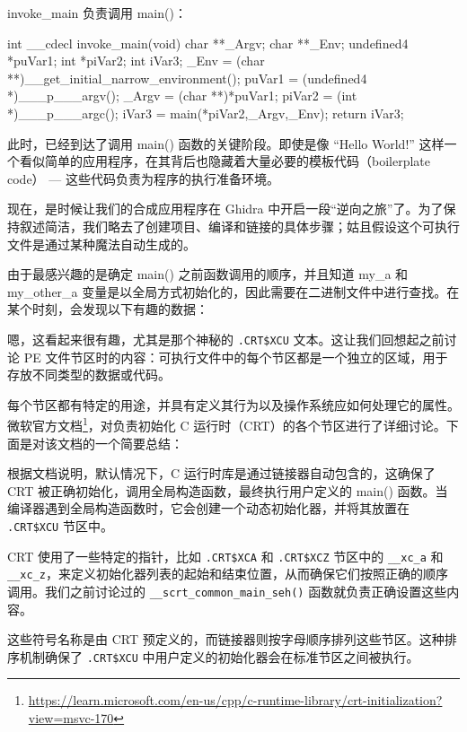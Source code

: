 
invoke\_main 负责调用 main()：

\begin{cpp}
int __cdecl invoke_main(void) {
  char **_Argv;
  char **_Env;
  undefined4 *puVar1;
  int *piVar2;
  int iVar3;
  _Env = (char **)__get_initial_narrow_environment();
  puVar1 = (undefined4 *)___p___argv();
  _Argv = (char **)*puVar1;
  piVar2 = (int *)___p___argc();
  iVar3 = main(*piVar2,_Argv,_Env);
  return iVar3;
}
\end{cpp}

此时，已经到达了调用 main() 函数的关键阶段。即使是像 “Hello World!” 这样一个看似简单的应用程序，在其背后也隐藏着大量必要的模板代码（boilerplate code） --- 这些代码负责为程序的执行准备环境。

现在，是时候让我们的合成应用程序在 Ghidra 中开启一段“逆向之旅”了。为了保持叙述简洁，我们略去了创建项目、编译和链接的具体步骤；姑且假设这个可执行文件是通过某种魔法自动生成的。

由于最感兴趣的是确定 main() 之前函数调用的顺序，并且知道 my\_a 和 my\_other\_a 变量是以全局方式初始化的，因此需要在二进制文件中进行查找。在某个时刻，会发现以下有趣的数据：


嗯，这看起来很有趣，尤其是那个神秘的 \verb|.CRT$XCU| 文本。这让我们回想起之前讨论 PE 文件节区时的内容：可执行文件中的每个节区都是一个独立的区域，用于存放不同类型的数据或代码。

每个节区都有特定的用途，并具有定义其行为以及操作系统应如何处理它的属性。微软官方文档\footnote{\url{https://learn.microsoft.com/en-us/cpp/c-runtime-library/crt-initialization?view=msvc-170}}，对负责初始化 C 运行时（CRT）的各个节区进行了详细讨论。下面是对该文档的一个简要总结：

根据文档说明，默认情况下，C 运行时库是通过链接器自动包含的，这确保了 CRT 被正确初始化，调用全局构造函数，最终执行用户定义的 main() 函数。当编译器遇到全局构造函数时，它会创建一个动态初始化器，并将其放置在 \verb|.CRT$XCU| 节区中。

CRT 使用了一些特定的指针，比如 \verb|.CRT$XCA| 和 \verb|.CRT$XCZ| 节区中的 \verb|__xc_a| 和 \verb|__xc_z|，来定义初始化器列表的起始和结束位置，从而确保它们按照正确的顺序调用。我们之前讨论过的 \verb|__scrt_common_main_seh()| 函数就负责正确设置这些内容。

这些符号名称是由 CRT 预定义的，而链接器则按字母顺序排列这些节区。这种排序机制确保了 \verb|.CRT$XCU| 中用户定义的初始化器会在标准节区之间被执行。

